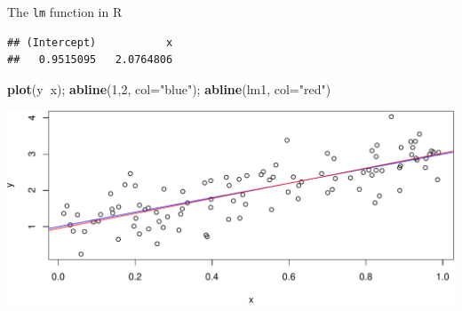 \documentclass[
  ignorenonframetext,
]{beamer}
\newenvironment{Shaded}{\begin{snugshade}}{\end{snugshade}}
\newcommand{\DataTypeTok}[1]{\textcolor[rgb]{0.13,0.29,0.53}{#1}}
\newcommand{\DecValTok}[1]{\textcolor[rgb]{0.00,0.00,0.81}{#1}}
\newcommand{\KeywordTok}[1]{\textcolor[rgb]{0.13,0.29,0.53}{\textbf{#1}}}
\newcommand{\NormalTok}[1]{#1}
\newcommand{\OperatorTok}[1]{\textcolor[rgb]{0.81,0.36,0.00}{\textbf{#1}}}
\newcommand{\StringTok}[1]{\textcolor[rgb]{0.31,0.60,0.02}{#1}}
\begin{document}
\begin{frame}[fragile]{The \texttt{lm} function in R}
\protect\hypertarget{the-lm-function-in-r}{}

\scriptsize

\begin{Shaded}
\end{Shaded}

\begin{verbatim}
## (Intercept)           x 
##   0.9515095   2.0764806
\end{verbatim}

\begin{Shaded}
\begin{Highlighting}[]
\KeywordTok{plot}\NormalTok{(y}\OperatorTok{~}\NormalTok{x); }\KeywordTok{abline}\NormalTok{(}\DecValTok{1}\NormalTok{,}\DecValTok{2}\NormalTok{, }\DataTypeTok{col=}\StringTok{"blue"}\NormalTok{); }\KeywordTok{abline}\NormalTok{(lm1, }\DataTypeTok{col=}\StringTok{"red"}\NormalTok{)}
\end{Highlighting}
\end{Shaded}

\includegraphics{Regression_and_ANOVA_files/figure-beamer/unnamed-chunk-3-1.pdf}

\end{frame}
\end{document}

